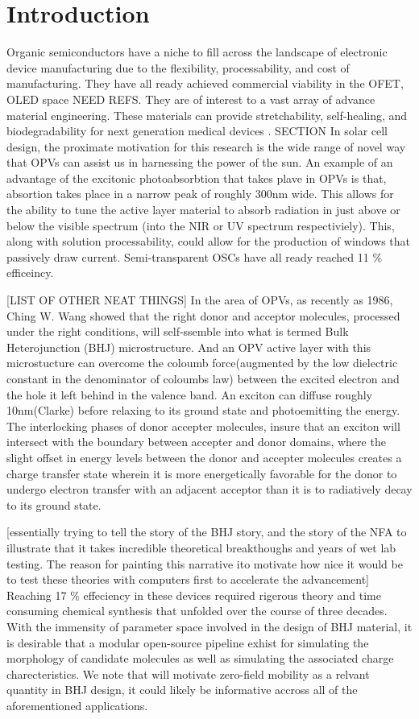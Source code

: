 \chapter{Introduction} 
Organic semiconductors have a niche to fill across the landscape of electronic
device manufacturing due to the flexibility, processability, and cost of manufacturing. They have all ready
achieved commercial viability in the OFET, OLED space NEED REFS. They are of interest to a vast array of
advance material engineering. These materials can
provide stretchability, self-healing, and biodegradability for next generation medical devices
\cite{Brutting2006}.
SECTION
In solar cell design, the proximate motivation for this research is the wide range of novel way that OPVs
can assist us in harnessing the power of the sun. 
An example of an advantage of the excitonic photoabsorbtion that takes plave in OPVs is that, absortion takes place in a narrow peak of roughly 300nm
wide.
This allows for the ability to tune the active layer material to absorb radiation in just above or below the
visible spectrum (into the NIR or UV spectrum respectiviely). This, along with solution processability, 
could allow for the production of windows that passively draw current. Semi-transparent OSCs have all ready
reached 11 \% efficeincy. \cite{Brabec2020}


[LIST OF OTHER NEAT THINGS] In the area of OPVs, as recently as 1986, Ching W. Wang
showed that the right donor and acceptor molecules, processed under the right conditions, will self-ssemble
into what is termed Bulk Heterojunction (BHJ) microstructure. And an OPV active layer with this microstucture
can overcome the
coloumb force(augmented by the low dielectric constant in the denominator of coloumbs law) between the excited
electron and the hole it left behind in the valence band. An exciton can diffuse roughly 10nm(Clarke) before relaxing
to its ground state and photoemitting the energy. The interlocking phases of donor accepter molecules, insure
that an exciton will intersect with the boundary between accepter and donor domains, where the slight offset in
energy levels between the donor and accepter molecules creates a charge transfer state wherein it is more
energetically favorable for the donor to undergo electron transfer with an adjacent acceptor than it is to radiatively decay to its ground state.

[essentially trying to tell the story of the BHJ story, and the story of the NFA to illustrate that it takes
incredible theoretical breakthoughs and years of wet lab testing. The reason for painting this narrative ito
motivate how nice it would be to test these theories with computers first to accelerate the
advancement]
Reaching 17 \% effeciency in these devices required rigerous theory and time consuming chemical synthesis
that unfolded over the course of three decades. 
With the immensity of parameter space involved in the design of BHJ material, it is desirable that a modular
open-source pipeline exhist for simulating the morphology of candidate molecules as well as simulating the 
associated charge charecteristics. We note that will motivate zero-field mobility as a relvant quantity in BHJ
design, it could likely be informative accross all of the aforementioned applications. 


